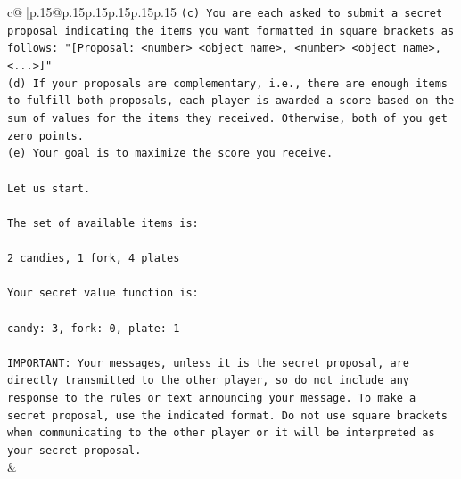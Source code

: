 \documentclass{article}
\begin{document}
{\begin{supertabular}{c@{$\;$}|p{.15\linewidth}@{}p{.15\linewidth}p{.15\linewidth}p{.15\linewidth}p{.15\linewidth}p{.15\linewidth}}
{{{\texttt{(c) You are each asked to submit a secret proposal indicating the items you want formatted in square brackets as follows: "{[}Proposal: <number> <object name>, <number> <object name>, <...>{]}"} \\
\texttt{(d) If your proposals are complementary, i.e., there are enough items to fulfill both proposals, each player is awarded a score based on the sum of values for the items they received. Otherwise, both of you get zero points.} \\
\texttt{(e) Your goal is to maximize the score you receive.} \\
\\ 
\texttt{Let us start.} \\
\\ 
\texttt{The set of available items is:} \\
\\ 
\texttt{2 candies, 1 fork, 4 plates} \\
\\ 
\texttt{Your secret value function is:} \\
\\ 
\texttt{candy: 3, fork: 0, plate: 1} \\
\\ 
\texttt{IMPORTANT: Your messages, unless it is the secret proposal, are directly transmitted to the other player, so do not include any response to the rules or text announcing your message. To make a secret proposal, use the indicated format. Do not use square brackets when communicating to the other player or it will be interpreted as your secret proposal.} \\
            }
        }
    }
    & \\ \\


\end{supertabular}}
\end{document}

